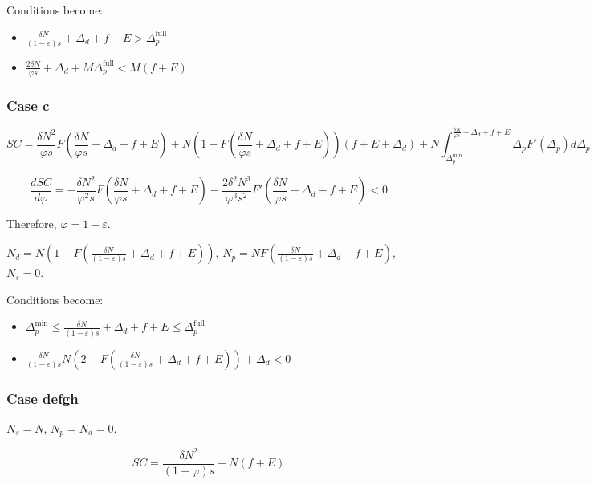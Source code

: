 \documentclass[english, a4paper]{article}
\theoremstyle{plain}
\theoremstyle{definition}
\theoremstyle{remark}
\begin{document}
    Conditions become:
    \begin{itemize}
        \item $\frac{\delta N}{(1 - \varepsilon) s} + \Delta_d + f + E > \Delta_p^{\text{full}}$
        \item $\frac{2\delta N}{\varphi s} + \Delta_d + M\Delta_p^{\text{full}} < M(f + E)$
    \end{itemize}

    \subsubsection{Case c}

    \[
    SC = \frac{\delta N^2}{\varphi s}F\left( \frac{\delta N}{\varphi s} + \Delta_d + f + E \right) + N\left(1 - F\left( \frac{\delta N}{\varphi s} + \Delta_d + f + E\right) \right)(f + E + \Delta_d) + N\int_{\Delta_p^{\text{min}}}^{\frac{\delta N}{\varphi s} + \Delta_d + f + E} \Delta_pF'(\Delta_p)d\Delta_p
    \]

    \[
    \frac{d SC}{d \varphi} = -\frac{\delta N^2}{\varphi^2 s}F\left( \frac{\delta N}{\varphi s} + \Delta_d + f + E\right) - \frac{2 \delta^2 N^3}{\varphi ^3 s^2} F'\left( \frac{\delta N}{\varphi s} + \Delta_d + f + E\right) < 0
    \]

    Therefore, $\varphi = 1 - \varepsilon$.

    $N_d = N\left( 1 - F\left( \frac{\delta N}{(1 - \varepsilon) s} + \Delta_d + f + E \right) \right)$, $N_p = NF\left( \frac{\delta N}{(1 - \varepsilon) s} + \Delta_d + f + E \right)$, $N_s = 0$.

    Conditions become:
    \begin{itemize}
        \item $\Delta_p^{\text{min}} \leq \frac{\delta N}{(1 - \varepsilon) s} + \Delta_d + f + E \leq \Delta_p^{\text{full}}$
        \item $\frac{\delta N}{(1 - \varepsilon) s} N\left( 2 - F\left( \frac{\delta N}{(1 - \varepsilon) s} + \Delta_d + f + E \right) \right) + \Delta_d < 0$
    \end{itemize}

    \subsubsection{Case defgh}

    $N_s = N$, $N_p = N_d = 0$.

    \[
    SC = \frac{\delta N^2}{(1 - \varphi) s} + N (f + E)
    \]
\end{document}
